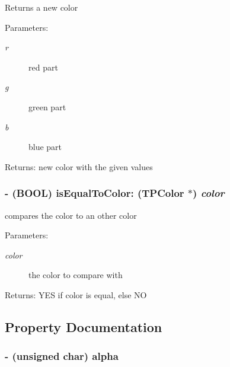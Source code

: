 Returns a new color \begin{Desc}
\item[Parameters:]
\begin{description}
\item[{\em r}]red part \item[{\em g}]green part \item[{\em b}]blue part \end{description}
\end{Desc}
\begin{Desc}
\item[Returns:]new color with the given values \end{Desc}
\hypertarget{interface_t_p_color_ddcd99b87a88f0b5f2c678f9cb4d0737}{
\subsubsection[{isEqualToColor:}]{\setlength{\rightskip}{0pt plus 5cm}- (BOOL) isEqualToColor: ({\bf TPColor} $\ast$) {\em color}}}
\label{interface_t_p_color_ddcd99b87a88f0b5f2c678f9cb4d0737}


compares the color to an other color \begin{Desc}
\item[Parameters:]
\begin{description}
\item[{\em color}]the color to compare with \end{description}
\end{Desc}
\begin{Desc}
\item[Returns:]YES if color is equal, else NO \end{Desc}


\subsection{Property Documentation}
\hypertarget{interface_t_p_color_9fa955c7633315825a8c5c2edd77aebd}{
\subsubsection[{alpha}]{\setlength{\rightskip}{0pt plus 5cm}- (unsigned char) alpha}}
\label{interface_t_p_color_9fa955c7633315825a8c5c2edd77aebd}


